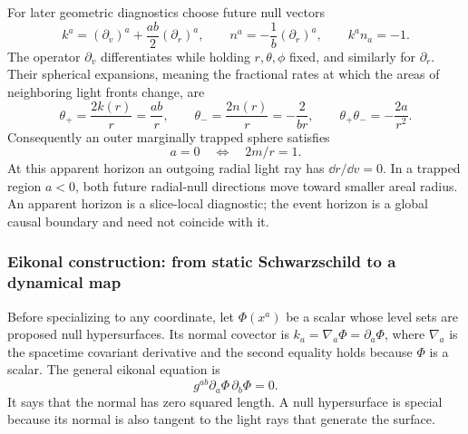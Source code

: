 For later geometric diagnostics choose future null vectors
\[
 k^a=(\partial_v)^a+\frac{ab}{2}(\partial_r)^a,\qquad
 n^a=-\frac1b(\partial_r)^a,\qquad k^a n_a=-1.            \tag{IEF6}
\]
The operator \(\partial_v\) differentiates while holding \(r,\theta,\phi\)
fixed, and similarly for \(\partial_r\).  Their spherical expansions, meaning
the fractional rates at which the areas of neighboring light fronts change,
are
\[
 \theta_+=\frac{2k(r)}r=\frac{ab}{r},\qquad
 \theta_-=\frac{2n(r)}r=-\frac{2}{br},\qquad
 \theta_+\theta_-=-\frac{2a}{r^2}.                        \tag{IEF7}
\]
Consequently an outer marginally trapped sphere satisfies
\[
 a=0\quad\Longleftrightarrow\quad 2m/r=1.                 \tag{IEF8}
\]
At this apparent horizon an outgoing radial light ray has
\(\dd r/\dd v=0\).  In a trapped region \(a<0\), both future radial-null
directions move toward smaller areal radius.  An apparent horizon is a
slice-local diagnostic; the event horizon is a global causal boundary and
need not coincide with it.

\subsubsection{Eikonal construction: from static Schwarzschild to a dynamical map}
\label{sec:ef-eikonal-construction}

Before specializing to any coordinate, let \(\Phi(x^a)\) be a scalar whose
level sets are proposed null hypersurfaces.  Its normal covector is
\(k_a=\nabla_a\Phi=\partial_a\Phi\), where \(\nabla_a\) is the spacetime
covariant derivative and the second equality holds because \(\Phi\) is a
scalar.  The general eikonal equation is
\[
 \boxed{g^{ab}\partial_a\Phi\,\partial_b\Phi=0.}           \tag{IEF-EIK}
\]
It says that the normal has zero squared length.  A null hypersurface is
special because its normal is also tangent to the light rays that generate
the surface.

